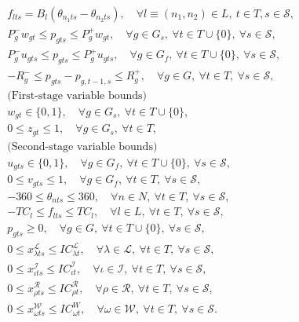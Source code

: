 \begin{subequations}
\begin{align}
	&f_{lts}=B_l\left(  \theta_{n_1 ts}-\theta_{n_2 ts}  \right),\quad\forall l\equiv (n_1, n_2)\in L,\ t\in T, s\in\mathcal{S},\label{SUC:i}\\
	&P_g^- w_{gt} \le p_{gts} \le P_g^+ w_{gt},\quad\forall g\in G_s,\ \forall t\in T\cup\{0\},\ \forall s\in\mathcal{S},\label{SUC:j}\\
	&P_g^- u_{gts} \le p_{gts} \le P_g^+ u_{gts},\quad\forall g\in G_f,\ \forall t\in T\cup\{0\},\ \forall s\in\mathcal{S},\label{SUC:k}\\
	&-R_g^- \le p_{gts}-p_{g,t-1,s} \le R_g^+ ,\quad\forall g\in G,\ \forall t\in T,\ \forall s\in\mathcal{S},\label{SUC:l}\\
	&  \textrm{(First-stage variable bounds)} \nonumber\\
	&w_{gt}\in\{0,1\},\quad\forall g\in G_s,\ \forall t\in T\cup\{0\},\label{SUC:m}\\
	& 0\le z_{gt}\le 1,\quad\forall g\in G_s,\ \forall t\in T,\label{SUC:n}\\
	&  \textrm{(Second-stage variable bounds)} \nonumber\\
	&u_{gts}\in\{0,1\},\quad\forall g\in G_f,\ \forall t\in T\cup\{0\},\ \forall s\in\mathcal{S},\label{SUC:o}\\
	&0\le v_{gts}\le 1,\quad\forall g\in G_f,\ \forall t\in T,\ \forall s\in\mathcal{S},\label{SUC:p}\\
	&-360\le\theta_{nts}\le 360,\quad\forall n\in N,\ \forall t\in T,\ \forall s\in\mathcal{S},\label{SUC:q}\\
	&-TC_l\le f_{lts}\le TC_l,\quad\forall l\in L,\ \forall t\in T,\ \forall s\in\mathcal{S},\label{SUC:r}\\
	&p_{gts}\ge 0,\quad\forall g\in G,\ \forall t\in T\cup\{0\},\ \forall s\in\mathcal{S},\label{SUC:s}\\
	&0\le x_{\lambda ts}^\mathcal{L}\le IC_{\lambda t}^\mathcal{L},\quad\forall \lambda\in \mathcal{L},\ \forall t\in T,\ \forall s\in\mathcal{S},\label{SUC:t}\\
	&0\le x_{\iota ts}^\mathcal{I}\le IC_{\iota t}^\mathcal{I},\quad\forall \iota \in \mathcal{I},\ \forall t\in T,\ \forall s\in\mathcal{S},\label{SUC:u}\\
	&0\le x_{\rho ts}^\mathcal{R} \le IC_{\rho t}^\mathcal{R},\quad\forall \rho\in\mathcal{R},\ \forall t\in T,\ \forall s\in\mathcal{S},\label{SUC:v}\\
	&0\le x_{\omega ts}^\mathcal{W}\le IC_{\omega t}^W,\quad\forall \omega\in\mathcal{W},\ \forall t\in T,\ \forall s\in\mathcal{S}.\label{SUC:w}
	\end{align}	
\end{subequations}


